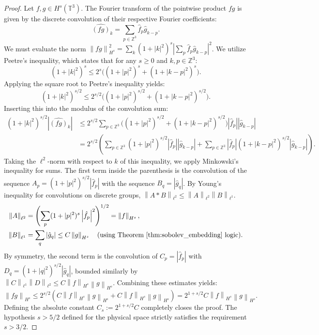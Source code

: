 \documentclass[12pt,a4paper]{article}
\theoremstyle{plain}
\theoremstyle{definition}
\theoremstyle{remark}
\newcommand{\T}{\mathbb{T}}
\newcommand{\Z}{\mathbb{Z}}
\newcommand{\norm}[1]{\left\|#1\right\|}
\newcommand{\abs}[1]{\left|#1\right|}
\begin{document}
\begin{proof}
Let $f, g \in H^s(\T^3)$. The Fourier transform of the pointwise product $fg$ is given by the discrete convolution of their respective Fourier coefficients:
\[
  \widehat{(fg)}_k = \sum_{p \in \Z^3} \hat{f}_p \hat{g}_{k-p}.
\]
We must evaluate the norm $\norm{fg}_{H^s}^2 = \sum_{k} (1+|k|^2)^s \abs{\sum_{p} \hat{f}_p \hat{g}_{k-p}}^2$. We utilize Peetre's inequality, which states that for any $s \ge 0$ and $k, p \in \Z^3$:
\[
  (1+|k|^2)^s \le 2^s \big( (1+|p|^2)^s + (1+|k-p|^2)^s \big).
\]
Applying the square root to Peetre's inequality yields:
\[
  (1+|k|^2)^{s/2} \le 2^{s/2} \big( (1+|p|^2)^{s/2} + (1+|k-p|^2)^{s/2} \big).
\]
Inserting this into the modulus of the convolution sum:
\begin{align*}
  (1+|k|^2)^{s/2} \abs{\widehat{(fg)}_k} 
  &\le 2^{s/2} \sum_{p \in \Z^3} \big( (1+|p|^2)^{s/2} + (1+|k-p|^2)^{s/2} \big) \abs{\hat{f}_p} \abs{\hat{g}_{k-p}} \\
  &= 2^{s/2} \left( \sum_{p \in \Z^3} (1+|p|^2)^{s/2} \abs{\hat{f}_p} \abs{\hat{g}_{k-p}} + \sum_{p \in \Z^3} \abs{\hat{f}_p} (1+|k-p|^2)^{s/2} \abs{\hat{g}_{k-p}} \right).
\end{align*}
Taking the $\ell^2$-norm with respect to $k$ of this inequality, we apply Minkowski's inequality for sums. The first term inside the parenthesis is the convolution of the sequence $A_p = (1+|p|^2)^{s/2} \abs{\hat{f}_p}$ with the sequence $B_q = \abs{\hat{g}_q}$. By Young's inequality for convolutions on discrete groups, $\norm{A * B}_{\ell^2} \le \norm{A}_{\ell^2} \norm{B}_{\ell^1}$. 
\begin{align*}
  \norm{A}_{\ell^2} &= \left( \sum_{p} (1+|p|^2)^s \abs{\hat{f}_p}^2 \right)^{1/2} = \norm{f}_{H^s}, \\
  \norm{B}_{\ell^1} &= \sum_{q} \abs{\hat{g}_q} \le C \norm{g}_{H^s} \quad \text{(using Theorem \ref{thm:sobolev_embedding} logic)}.
\end{align*}
By symmetry, the second term is the convolution of $C_p = \abs{\hat{f}_p}$ with $D_q = (1+|q|^2)^{s/2} \abs{\hat{g}_q}$, bounded similarly by $\norm{C}_{\ell^1} \norm{D}_{\ell^2} \le C \norm{f}_{H^s} \norm{g}_{H^s}$. 
Combining these estimates yields:
\[
  \norm{fg}_{H^s} \le 2^{s/2} (C \norm{f}_{H^s} \norm{g}_{H^s} + C \norm{f}_{H^s} \norm{g}_{H^s}) = 2^{1+s/2} C \norm{f}_{H^s} \norm{g}_{H^s}.
\]
Defining the absolute constant $C_s := 2^{1+s/2} C$ completely closes the proof. The hypothesis $s > 5/2$ defined for the physical space strictly satisfies the requirement $s > 3/2$.
\end{proof}
\end{document}
